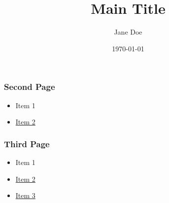 \documentclass[]{beamer}
\title{Main Title}
\author{Jane Doe}
\institute{University A}
\date{\today}
\begin{document}
    
    \begin{frame}[label={important}]
        \frametitle{Second Page}
        \begin{itemize}
            
            \item Item 1
            \pause
            \item \hyperlink{foo<2>}{Item 2}
        \end{itemize}
    \end{frame}
    
    \begin{frame}[label={foo}]
        \frametitle{Third Page}
        \begin{itemize}
            
            \item Item 1
            \pause
            \item \hyperlink{important<2>}{Item 2}
            \item \hyperlink{important}{Item 3}
        \end{itemize}
    \end{frame}
    
\end{document}

